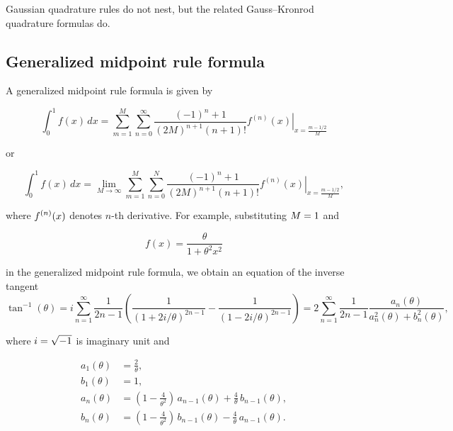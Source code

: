\documentclass[a4paper]{article}
\begin{document}
Gaussian quadrature rules do not nest, but the related Gauss–Kronrod quadrature formulas do.

\subsection{Generalized midpoint rule formula}
A generalized midpoint rule formula is given by

\begin{equation*}
	\int _{0}^{1}{f(x)\,dx}=\sum _{m=1}^{M}{\sum _{n=0}^{\infty }{{\frac {{{\left({-1}\right)}^{n}}+1}{{{\left({2M}\right)}^{n+1}}\left({n+1}\right)!}}{{\left.{{f^{\left(n\right)}}\left(x\right)}\right|}_{x={\frac {m-1/2}{M}}}}}}
\end{equation*}

or

\begin{equation*}
	\int _{0}^{1}{f(x)\,dx}=\lim _{M\to \infty }\sum _{m=1}^{M}{\sum _{n=0}^{N}{{\frac {{{\left({-1}\right)}^{n}}+1}{{{\left({2M}\right)}^{n+1}}\left({n+1}\right)!}}{{\left.{{f^{\left(n\right)}}\left(x\right)}\right|}_{x={\frac {m-1/2}{M}}}}}},
\end{equation*}

where ${\displaystyle f^{(n)}(x)}$ denotes $n$-th derivative. For example, substituting ${\displaystyle M=1}$ and

\begin{equation*}
	f(x)={\frac {\theta }{1+\theta ^{2}x^{2}}}
\end{equation*}

in the generalized midpoint rule formula, we obtain an equation of the inverse tangent
\begin{equation*}
	\tan ^{-1}(\theta )=i\sum _{n=1}^{\infty }{\frac {1}{2n-1}}\left({\frac {1}{\left(1+2i/\theta \right)^{2n-1}}}-{\frac {1}{\left(1-2i/\theta \right)^{2n-1}}}\right)=2\sum _{n=1}^{\infty }{{\frac {1}{2n-1}}{\frac {{{a}_{n}}\left(\theta \right)}{a_{n}^{2}\left(\theta \right)+b_{n}^{2}\left(\theta \right)}}},
\end{equation*}

where ${\displaystyle i={\sqrt {-1}}}$ is imaginary unit and

\begin{equation*}
	\begin{aligned}
		a_{1}(\theta )&={\frac {2}{\theta }},\\
		b_{1}(\theta )&=1,\\
		a_{n}(\theta )&=\left(1-{\frac {4}{\theta ^{2}}}\right)\,a_{n-1}(\theta )+{\frac {4}{\theta }}\,b_{n-1}(\theta ),\\
		b_{n}(\theta )&=\left(1-{\frac {4}{\theta ^{2}}}\right)\,b_{n-1}(\theta )-{\frac {4}{\theta }}\,a_{n-1}(\theta ).
	\end{aligned}
\end{equation*}
\end{document}
